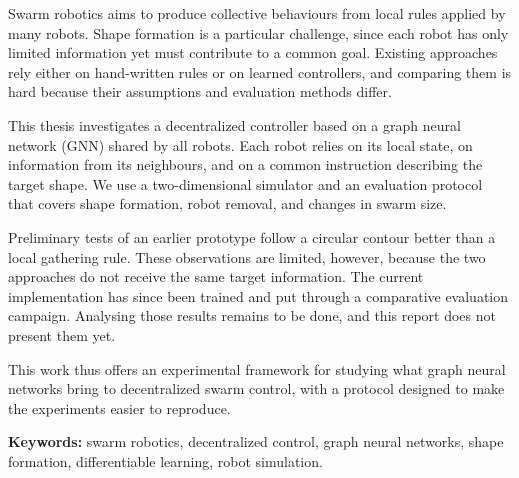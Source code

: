 Swarm robotics aims to produce collective behaviours from local rules
applied by many robots. Shape formation is a particular challenge, since
each robot has only limited information yet must contribute to a common
goal. Existing approaches rely either on hand-written rules or on
learned controllers, and comparing them is hard because their assumptions
and evaluation methods differ.

This thesis investigates a decentralized controller based on a graph
neural network (GNN) shared by all robots. Each robot relies on its local
state, on information from its neighbours, and on a common instruction
describing the target shape. We use a two-dimensional simulator and an
evaluation protocol that covers shape formation, robot removal, and
changes in swarm size.

Preliminary tests of an earlier prototype follow a circular contour
better than a local gathering rule. These observations are limited,
however, because the two approaches do not receive the same target
information. The current implementation has since been trained and put
through a comparative evaluation campaign. Analysing those results
remains to be done, and this report does not present them yet.

This work thus offers an experimental framework for studying what graph
neural networks bring to decentralized swarm control, with a protocol
designed to make the experiments easier to reproduce.

\noindent\textbf{Keywords:} swarm robotics, decentralized control,
graph neural networks, shape formation, differentiable learning,
robot simulation.

\cleardoublepage